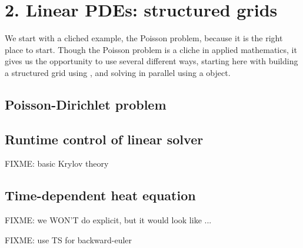 
\chapter{2. Linear PDEs: structured grids}

We start with a cliched example, the Poisson problem, because it is the right place to start.  Though the Poisson problem is a cliche in applied mathematics, it gives us the opportunity to use \PETSc several different ways, starting here with building a structured grid using \PETSc \pDMDA, and solving in parallel using a \pKSP object.

\section{Poisson-Dirichlet problem}




\section{Runtime control of linear solver}

FIXME: basic Krylov theory

\section{Time-dependent heat equation}

FIXME: we WON'T do explicit, but it would look like ...

FIXME: use TS for backward-euler
